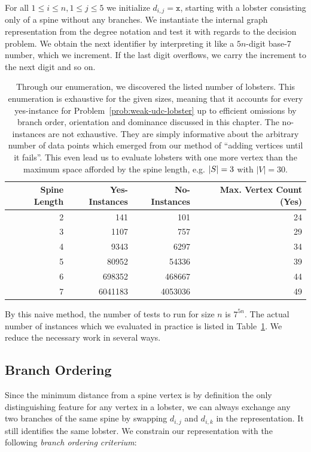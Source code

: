 For all $1 \leq i \leq n, 1 \leq j \leq 5$ we initialize $d_{i,j} = \texttt x$, starting with a lobster consisting only of a spine without any branches. We instantiate the internal graph representation from the degree notation and test it with regards to the decision problem.
We obtain the next identifier by interpreting it like a $5n$-digit base-7 number, which we increment. If the last digit overflows, we carry the increment to the next digit and so on.

\begin{table}
\centering
\begin{tabular}{ r|r|r|r }
\toprule
Spine Length & Yes-Instances & No-Instances & Max. Vertex Count (Yes) \\
 \hline
2	 & 141	 	& 101 	& 24 \\
3	 & 1107	 	& 757 	& 29 \\
4	 & 9343	 	& 6297 	& 34 \\
5	 & 80952	& 54336 	& 39 \\
6	 & 698352	& 468667 	& 44 \\
7	 & 6041183	& 4053036 	& 49 \\
\bottomrule
\end{tabular}
\caption[Instance count by spine size]{Through our enumeration, we discovered the listed number of lobsters. This enumeration is exhaustive for the given sizes, meaning that it accounts for every yes-instance for Problem~\ref{prob:weak-udc-lobster} up to efficient omissions by branch order, orientation and dominance discussed in this chapter. The no-instances are not exhaustive. They are simply informative about the arbitrary number of data points which emerged from our method of ``adding vertices until it fails''. This even lead us to evaluate lobsters with one more vertex than the maximum space afforded by the spine length, e.g. $|S|=3$ with $|V|=30$.}
\label{tbl:instance-count}
\end{table}

By this naive method, the number of tests to run for size $n$ is $7^{5n}$. The actual number of instances which we evaluated in practice is listed in Table~\ref{tbl:instance-count}. We reduce the necessary work in several ways.

\subsection{Branch Ordering}

Since the minimum distance from a spine vertex is by definition the only distinguishing feature for any vertex in a lobster, we can always exchange any two branches of the same spine by swapping $d_{i,j}$ and $d_{i,k}$ in the representation. It still identifies the same lobster. We constrain our representation with the following \emph{branch ordering criterium}:

